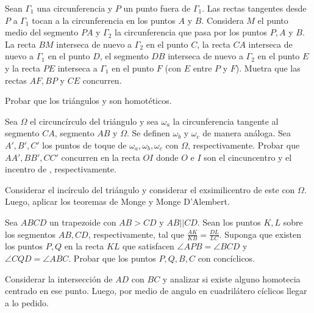 \begin{section-problem}
    Sean $\Gamma_1$ una circunferencia y $P$ un punto fuera de $\Gamma_1$.
    Las rectas tangentes desde $P$ a $\Gamma_1$ tocan a la circunferencia en los puntos $A$ y $B$.
    Considera $M$ el punto medio del segmento $PA$ y $\Gamma_2$ la circunferencia que pasa por los puntos $P, A$ y $B$.
    La recta $BM$ interseca de nuevo a $\Gamma_2$ en el punto $C$, la recta $CA$ interseca de nuevo a $\Gamma_1$ en el punto $D$, el segmento $DB$ interseca de nuevo a $\Gamma_2$ en el punto $E$ y la recta $PE$ interseca a $\Gamma_1$ en el punto $F$ (con $E$ entre $P$ y $F$).
    Muetra que las rectas $AF, BP$ y $CE$ concurren.
\end{section-problem}

\begin{hint}
    Probar que los triángulos  y  son homotéticos.
\end{hint}


\begin{section-problem}
    Sea $\Omega$ el circuncírculo del triángulo  y sea $\omega_a$ la circunferencia tangente al segmento $CA$, segmento $AB$ y $\Omega$.
    Se definen $\omega_b$ y $\omega_c$ de manera análoga.
    Sea $A', B', C'$ los puntos de toque de $\omega_a, \omega_b, \omega_c$ con $\Omega$, respectivamente.
    Probar que $AA', BB', CC'$ concurren en la recta $OI$ donde $O$ e $I$ son el cincuncentro y el incentro de , respectivamente.
\end{section-problem}

\begin{hint}
    Considerar el incírculo del triángulo  y considerar el exsimilicentro de este con $\Omega$.
    Luego, aplicar los teoremas de Monge y Monge D'Alembert.
\end{hint}


\begin{section-problem}
    Sea $ABCD$ un trapezoide con $AB > CD$ y $AB || CD$.
    Sean los puntos $K, L$ sobre los segmentos $AB, CD$, respectivamente, tal que $\frac{AK}{KB} = \frac{DL}{LC}$.
    Suponga que existen los puntos $P, Q$ en la recta $KL$ que satisfacen $\angle APB = \angle BCD$ y $\angle CQD = \angle ABC$.
    Probar que los puntos $P, Q, B, C$ con concíclicos.
\end{section-problem}

\begin{hint}
    Considerar la intersección de $AD$ con $BC$ y analizar si existe alguno homotecia centrado en ese punto.
    Luego, por medio de angulo en cuadrilátero cíclicos llegar a lo pedido.
\end{hint}



